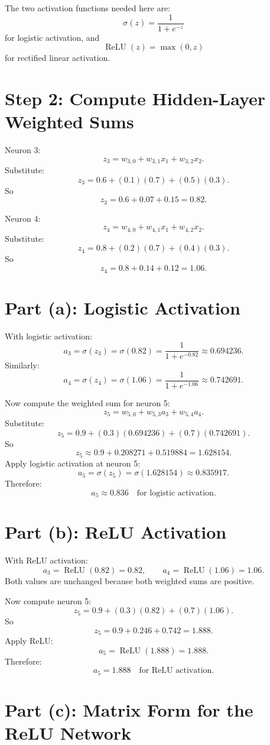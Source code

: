 \documentclass[11pt]{article}
\begin{document}
The two activation functions needed here are:
\[
\sigma(z)=\frac{1}{1+e^{-z}}
\]
for logistic activation, and
\[
\operatorname{ReLU}(z)=\max(0,z)
\]
for rectified linear activation.

\section*{Step 2: Compute Hidden-Layer Weighted Sums}

Neuron 3:
\[
z_3=w_{3,0}+w_{3,1}x_1+w_{3,2}x_2.
\]
Substitute:
\[
z_3=0.6+(0.1)(0.7)+(0.5)(0.3).
\]
So
\[
z_3=0.6+0.07+0.15=0.82.
\]

Neuron 4:
\[
z_4=w_{4,0}+w_{4,1}x_1+w_{4,2}x_2.
\]
Substitute:
\[
z_4=0.8+(0.2)(0.7)+(0.4)(0.3).
\]
So
\[
z_4=0.8+0.14+0.12=1.06.
\]

\section*{Part (a): Logistic Activation}

With logistic activation:
\[
a_3=\sigma(z_3)=\sigma(0.82)
=\frac{1}{1+e^{-0.82}}
\approx 0.694236.
\]
Similarly:
\[
a_4=\sigma(z_4)=\sigma(1.06)
=\frac{1}{1+e^{-1.06}}
\approx 0.742691.
\]

Now compute the weighted sum for neuron 5:
\[
z_5=w_{5,0}+w_{5,3}a_3+w_{5,4}a_4.
\]
Substitute:
\[
z_5=0.9+(0.3)(0.694236)+(0.7)(0.742691).
\]
So
\[
z_5\approx 0.9+0.208271+0.519884=1.628154.
\]
Apply logistic activation at neuron 5:
\[
a_5=\sigma(z_5)=\sigma(1.628154)
\approx 0.835917.
\]
Therefore:
\[
\boxed{a_5\approx 0.836\quad\text{for logistic activation}.}
\]

\section*{Part (b): ReLU Activation}

With ReLU activation:
\[
a_3=\operatorname{ReLU}(0.82)=0.82,
\qquad
a_4=\operatorname{ReLU}(1.06)=1.06.
\]
Both values are unchanged because both weighted sums are positive.

Now compute neuron 5:
\[
z_5=0.9+(0.3)(0.82)+(0.7)(1.06).
\]
So
\[
z_5=0.9+0.246+0.742=1.888.
\]
Apply ReLU:
\[
a_5=\operatorname{ReLU}(1.888)=1.888.
\]
Therefore:
\[
\boxed{a_5=1.888\quad\text{for ReLU activation}.}
\]

\section*{Part (c): Matrix Form for the ReLU Network}
\end{document}

